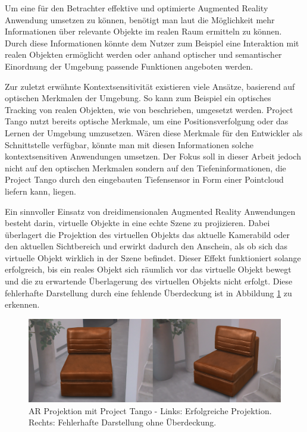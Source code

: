 Um eine für den Betrachter effektive und optimierte Augmented Reality Anwendung umsetzen zu können, benötigt man laut \citet{azuma2001recent} die Möglichkeit mehr Informationen über relevante Objekte im realen Raum ermitteln zu können. Durch diese Informationen könnte dem Nutzer zum Beispiel eine Interaktion mit realen Objekten ermöglicht werden oder anhand optischer und semantischer Einordnung der Umgebung passende Funktionen angeboten werden. 

Zur zuletzt erwähnte Kontextsensitivität existieren viele Ansätze, basierend auf optischen Merkmalen der Umgebung. So kann zum Beispiel ein optisches Tracking von realen Objekten, wie von \citet{lee2008hybrid} beschrieben, umgesetzt werden. Project Tango nutzt bereits optische Merkmale, um eine Positionsverfolgung oder das Lernen der Umgebung umzusetzen. Wären diese Merkmale für den Entwickler als Schnittstelle verfügbar, könnte man mit diesen Informationen solche kontextsensitiven Anwendungen umsetzen. Der Fokus soll in dieser Arbeit jedoch nicht auf den optischen Merkmalen sondern auf den Tiefeninformationen, die Project Tango durch den eingebauten Tiefensensor in Form einer Pointcloud liefern kann, liegen.

Ein sinnvoller Einsatz von dreidimensionalen Augmented Reality Anwendungen besteht darin, virtuelle Objekte in eine echte Szene zu projizieren. Dabei überlagert die Projektion des virtuellen Objekts das aktuelle Kamerabild oder den aktuellen Sichtbereich und erwirkt dadurch den Anschein, als ob sich das virtuelle Objekt wirklich in der Szene befindet. Dieser Effekt funktioniert solange erfolgreich, bis ein reales Objekt sich räumlich vor das virtuelle Objekt bewegt und die zu erwartende Überlagerung des virtuellen Objekts nicht erfolgt. Diese fehlerhafte Darstellung durch eine fehlende Überdeckung ist in Abbildung \ref{fig:occlusion-problem} zu erkennen. 

\begin{figure}[h]
  \centering
	\includegraphics[width=1.0\textwidth]{content/images/occlusion-problem.png} 

  \caption{AR Projektion mit Project Tango - Links: Erfolgreiche Projektion. Rechts: Fehlerhafte Darstellung ohne Überdeckung.}
  \label{fig:occlusion-problem}
\end{figure}

